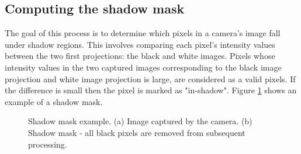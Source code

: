 \documentclass[final,12pt,3p]{elsarticle}
\begin{document}
\subsection{Computing the shadow mask}
\label{subsec:shadow_mask}
The goal of this process is to determine which pixels in a camera's image fall under shadow regions. This involves comparing each pixel's intensity values between the two first projections: the black and white images. Pixels whose intensity values in the two captured images corresponding to the black image projection and white image projection is large, are considered as a valid pixels. If the difference is small then the pixel is marked as "in-shadow". Figure \ref{fig:shadow_mask} shows an example of a shadow mask.
\begin{figure}[!ht]
	\centering
	\hfil 
	\caption{\label{fig:shadow_mask} Shadow mask example. (a) Image captured by the camera. (b) Shadow mask - all black pixels are removed from subsequent processing.}
\end{figure}
\end{document}
